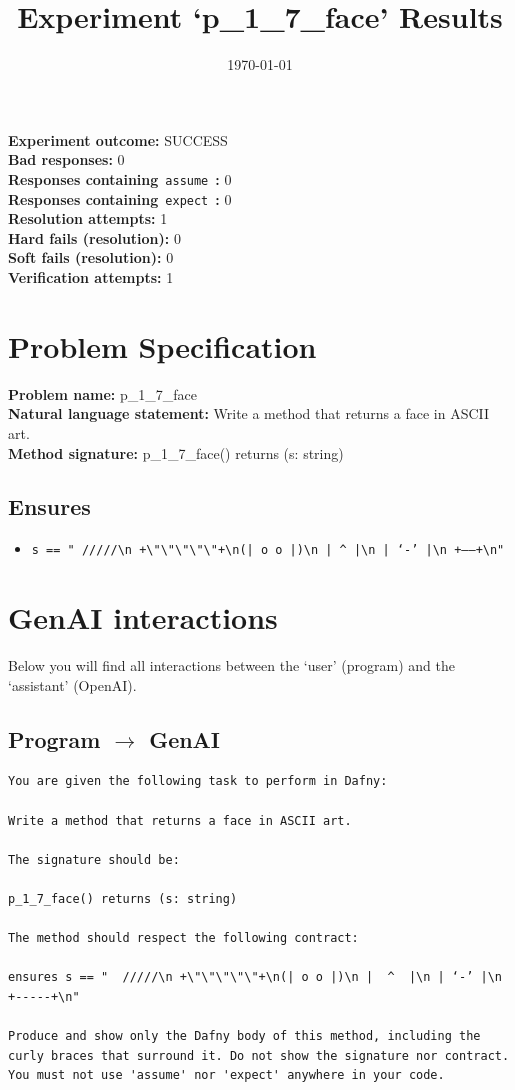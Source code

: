 \documentclass{article}
\begin{document}
\title{Experiment `p\_1\_7\_face' Results}
\author{\today}
\date{}
\maketitle
\textbf{Experiment outcome: }SUCCESS
\\\textbf{Bad responses: }0
\\\textbf{Responses containing}~\texttt{assume}~\textbf{: }0
\\\textbf{Responses containing}~\texttt{expect}~\textbf{: }0
\\\textbf{Resolution attempts: }1
\\\textbf{Hard fails (resolution): }0
\\\textbf{Soft fails (resolution): }0
\\\textbf{Verification attempts: }1
\section*{Problem Specification}
\textbf{Problem name: }p\_1\_7\_face
\\\textbf{Natural language statement: }Write a method that returns a face in ASCII art.
\\\textbf{Method signature: }p\_1\_7\_face() returns (s: string)
\subsection*{Ensures}
\begin{itemize}
\item \texttt{s == "  /////\textbackslash{}n +\textbackslash{}"\textbackslash{}"\textbackslash{}"\textbackslash{}"\textbackslash{}"+\textbackslash{}n(| o o |)\textbackslash{}n |  \^{}  |\textbackslash{}n | ‘-’ |\textbackslash{}n +-----+\textbackslash{}n"}
\end{itemize}
\clearpage
\section*{GenAI interactions}
Below you will find all interactions between the `user' (program) and the `assistant' (OpenAI).
\subsection*{Program $\rightarrow$ GenAI}
\begin{lstlisting}
You are given the following task to perform in Dafny:

Write a method that returns a face in ASCII art.

The signature should be:

p_1_7_face() returns (s: string)

The method should respect the following contract:

ensures s == "  /////\n +\"\"\"\"\"+\n(| o o |)\n |  ^  |\n | ‘-’ |\n +-----+\n"

Produce and show only the Dafny body of this method, including the curly braces that surround it. Do not show the signature nor contract. You must not use 'assume' nor 'expect' anywhere in your code.
\end{lstlisting}
\end{document}
